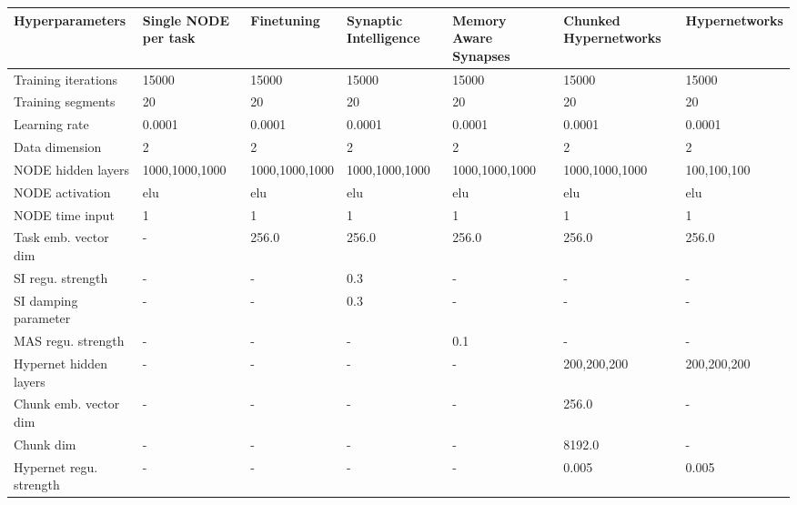 \begin{tabular}{lllllll}
\toprule
        Hyperparameters & Single NODE per task &     Finetuning & Synaptic Intelligence & Memory Aware Synapses & Chunked Hypernetworks & Hypernetworks \\
\midrule
    Training iterations &                15000 &          15000 &                 15000 &                 15000 &                 15000 &         15000 \\
      Training segments &                   20 &             20 &                    20 &                    20 &                    20 &            20 \\
          Learning rate &               0.0001 &         0.0001 &                0.0001 &                0.0001 &                0.0001 &        0.0001 \\
         Data dimension &                    2 &              2 &                     2 &                     2 &                     2 &             2 \\
     NODE hidden layers &       1000,1000,1000 & 1000,1000,1000 &        1000,1000,1000 &        1000,1000,1000 &        1000,1000,1000 &   100,100,100 \\
        NODE activation &                  elu &            elu &                   elu &                   elu &                   elu &           elu \\
        NODE time input &                    1 &              1 &                     1 &                     1 &                     1 &             1 \\
   Task emb. vector dim &                    - &          256.0 &                 256.0 &                 256.0 &                 256.0 &         256.0 \\
      SI regu. strength &                    - &              - &                   0.3 &                     - &                     - &             - \\
   SI damping parameter &                    - &              - &                   0.3 &                     - &                     - &             - \\
     MAS regu. strength &                    - &              - &                     - &                   0.1 &                     - &             - \\
 Hypernet hidden layers &                    - &              - &                     - &                     - &           200,200,200 &   200,200,200 \\
  Chunk emb. vector dim &                    - &              - &                     - &                     - &                 256.0 &             - \\
              Chunk dim &                    - &              - &                     - &                     - &                8192.0 &             - \\
Hypernet regu. strength &                    - &              - &                     - &                     - &                 0.005 &         0.005 \\
\bottomrule
\end{tabular}
